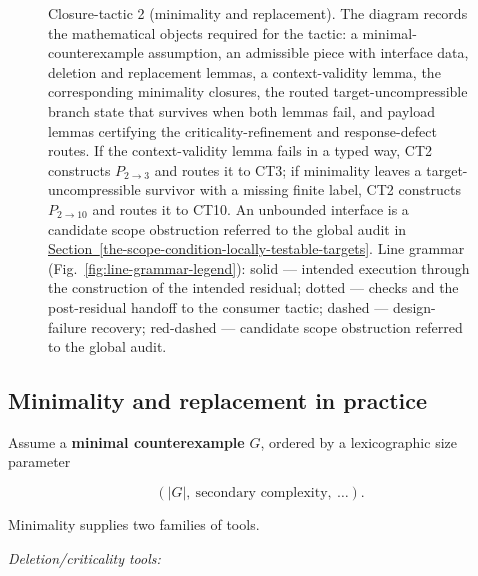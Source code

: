 \documentclass[
  11pt,
]{article}
\theoremstyle{definition}
\newcommand{\secref}[1]{\hyperref[#1]{Section~\ref*{#1}}}
\begin{document}
\begin{figure}[p]
{%
}
\caption[Closure-tactic 2: minimality and replacement]{Closure-tactic 2 (minimality and replacement).  The diagram records the mathematical objects required for the tactic: a minimal-counterexample assumption, an admissible piece with interface data, deletion and replacement lemmas, a context-validity lemma, the corresponding minimality closures, the routed target-uncompressible branch state that survives when both lemmas fail, and payload lemmas certifying the criticality-refinement and response-defect routes.  If the context-validity lemma fails in a typed way, CT2 constructs \(P_{2\to3}\) and routes it to CT3; if minimality leaves a target-uncompressible survivor with a missing finite label, CT2 constructs \(P_{2\to10}\) and routes it to CT10.  An unbounded interface is a candidate scope obstruction referred to the global audit in \secref{the-scope-condition-locally-testable-targets}.  Line grammar (Fig.~\ref{fig:line-grammar-legend}): solid --- intended execution through the construction of the intended residual; dotted --- checks and the post-residual handoff to the consumer tactic; dashed --- design-failure recovery; red-dashed --- candidate scope obstruction referred to the global audit.}
\label{fig:ct2-minimality-replacement}
\end{figure}
\FloatBarrier

\subsection*{Minimality and replacement in practice}

Assume a \textbf{minimal counterexample} \(G\), ordered by a
lexicographic size parameter

\[
(|G|,\ \text{secondary complexity},\ \ldots).
\]

Minimality supplies two families of tools.

\emph{Deletion/criticality tools:}
\end{document}

